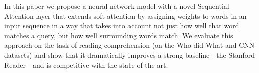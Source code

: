 In this paper we  propose a neural network model with a novel Sequential Attention layer that extends soft attention by assigning weights to words in an input sequence in a way that takes into account not just how well that word matches a query, but how well surrounding words match. We evaluate this approach on the task of reading comprehension (on the Who did What and CNN datasets) and show that it dramatically improves a strong baseline---the Stanford Reader---and is competitive with the state of the art.
